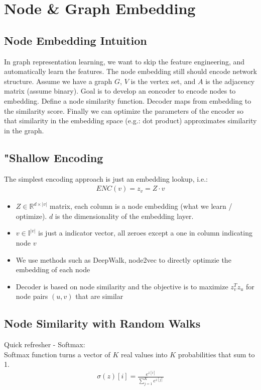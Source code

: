 \chapter{Node \& Graph Embedding}
\section{Node Embedding Intuition}
In graph representation learning, we want to skip the feature engineering, and automatically learn the features. The node embedding still should encode network structure. Assume we have a graph $G$, $V$ is the vertex set, and $A$ is the adjacency matrix (assume binary). Goal is to develop an eoncoder to encode nodes to embedding. Define a node similarity function. Decoder maps from embedding to the similarity score. Finally we can optimize the parameters of the encoder so that similarity in the embedding space (e.g.: dot product) approximates similarity in the graph.

\section{"Shallow Encoding}
The simplest encoding approach is just an embedding lookup, i.e.: 
    \begin{align*}
        ENC(v) = z_v = Z \cdot v
    \end{align*}
    \begin{itemize}
        \item $Z\in \mathbb{R}^{d \times |v|}$ matrix, each column is a node embedding (what we learn / optimize). $d$ is the dimensionality of the embedding layer. 
        \item $v\in \mathbb{I}^{|v|}$ is just a indicator vector, all zeroes except a one in column indicating node $v$
        \item We use methods such as DeepWalk, node2vec to directly optimzie the embedding of each node
        \item Decoder is based on node similarity and the objective is to maximize $z_v^Tz_u$ for node pairs $(u,v)$ that are similar
    \end{itemize}

\section{Node Similarity with Random Walks}
Quick refresher - Softmax: \\
Softmax function turns a vector of $K$ real values into $K$ probabilities that sum to 1. 
    \begin{align*}
        \sigma(z)[i] = \frac{e^{z[i]}}{\sum_{j=1}^K e^{z[j]}}
    \end{align*}
\\ \par

